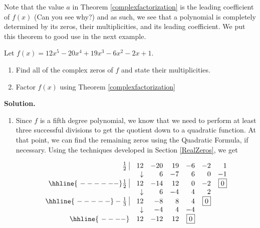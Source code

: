 \smallskip

Note that the value $a$ in Theorem \ref{complexfactorization} is the leading coefficient of $f(x)$ (Can you see why?) and as such, we see that a polynomial is completely determined by its zeros, their multiplicities, and its leading coefficient.  We put this theorem to good use in the next example.

\begin{ex}  Let $f(x) = 12x^5 - 20x^4+19x^3-6x^2-2x+1$.

\begin{enumerate}

\item Find all of the complex zeros of $f$ and state their multiplicities.  

\item  Factor $f(x)$ using Theorem \ref{complexfactorization}

\end{enumerate}

{ \bf Solution.}

\begin{enumerate}

\item  Since $f$ is a fifth degree polynomial, we know that we need to perform at least three successful divisions to get the quotient down to a quadratic function.  At that point, we can find the remaining zeros using the Quadratic Formula, if necessary.  Using the techniques developed in Section \ref{RealZeros}, we get

\[\begin{array}{rrrrrrr}
\frac{1}{2} \, \, \vline& 12 & -20& 19  & -6 & -2 &1 \\

  & \downarrow     &  6  &  -7  & 6 & 0 & -1\\ \hhline{~------} 

 \frac{1}{2} \, \, \vline& 12 & -14 & 12  & 0 & -2 & \fbox{$0$} \\

  & \downarrow     &  6 &  -4  & 4 & 2 &\\ \hhline{~-----} 
  
  -\frac{1}{3} \, \, \vline&  12 &  -8  & 8 & 4 &  \fbox{$0$} & \\
    
               & \downarrow &  -4  &  4  & -4  & & \\ \hhline{~----} 
 
   & 12  &   -12 & 12& \fbox{0} &&   \\
  



\end{array}\]
\end{enumerate}
\end{ex}
